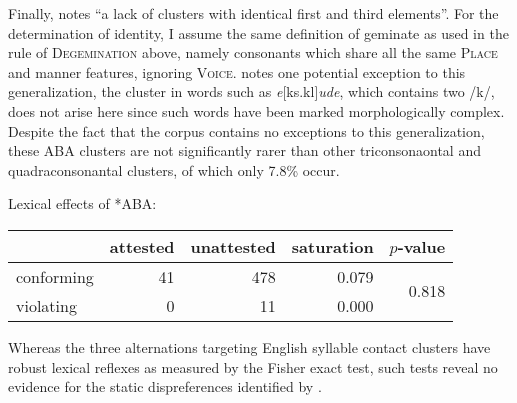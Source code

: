Finally, \citet[][176]{Pierrehumbert1994} notes ``a lack of clusters with identical first and third elements''. For the determination of identity, I assume the same definition of geminate as used in the rule of \textsc{Degemination} above, namely consonants which share all the same \textsc{Place} and manner features, ignoring \textsc{Voice}. 
\citeauthor{Pierrehumbert1994} notes one potential exception to this generalization, the cluster in words such as \emph{e}[ks.kl]\emph{ude}, which contains two /k/, does not arise here since such words have been marked morphologically complex. Despite the fact that the corpus contains no exceptions to this generalization, these \textsc{ABA} clusters are not significantly rarer than other triconsonaontal and quadraconsonantal clusters, of which only 7.8\% occur. 

\ex Lexical effects of \textsc{*ABA}: \vspace{6pt} \\
\begin{tabular}{l r r r r}
\toprule
           & attested & unattested & saturation & $p$-value \\
\midrule
conforming & 41 & 478 & 0.079 & \multirow{2}{*}{0.818} \\
violating  &  0 &  11 & 0.000 \\
\bottomrule
\end{tabular}
\xe

Whereas the three alternations targeting English syllable contact clusters have robust lexical reflexes as measured by the Fisher exact test, such tests reveal no evidence for the static dispreferences identified by \citeauthor{Pierrehumbert1994}.

